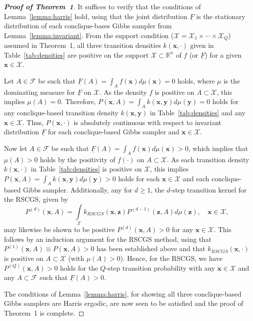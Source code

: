 \documentclass[12pt]{article}
\theoremstyle{definition}
\begin{document}
\begin{proof}[\bf Proof of Theorem~1] It  suffices to verify that the conditions of Lemma~\ref{lemma:harris} hold, using that the joint distribution $\underline{F}$ is the stationary distribution of each conclique-bases Gibbs sampler from   Lemma~\ref{lemma:invariant}. 
  From the support condition ($\mathcal{X} = \mathcal{X}_1 \times \cdots \times \mathcal{X}_Q$) assumed in Theorem~1,   all three transition densities  $k (\boldsymbol x, \cdot)$ given in Table~\ref{tab:densities}  are positive on the support $\mathcal{X} \subset \mathbb{R}^n$ of $f$ (or $\underline{F}$) for a given $\boldsymbol x \in\mathcal{X}$.

Let $A \in \mathcal{F}$   be such that  $\underline{F}(A) = \int_A f(\boldsymbol x) d\mu(\boldsymbol x) = 0$ holds, where $\mu$ is the dominating measure for $\underline{F}$ on $\mathcal{X}$.  As the density $ f$ is positive on $A \subset \mathcal{X}$, this implies $\mu(A) = 0$. Therefore, $P(\boldsymbol x, A) = \int_A k(\boldsymbol x, \boldsymbol y) d\mu(\boldsymbol y) = 0$ holds for any conclique-based transition density $k(\boldsymbol x, \boldsymbol y)$ in Table~\ref{tab:densities} and any
$\boldsymbol x \in\mathcal{X}$.  Thus, $P(\boldsymbol x, \cdot)$ is absolutely continuous with respect to invariant distribution $\underline{F}$ for each  conclique-based Gibbs sampler and $\boldsymbol x \in\mathcal{X}$.

Now  let $A \in\mathcal{F}$  be such that $\underline{F}(A)   = \int_A f(\boldsymbol x) d\mu(\boldsymbol x) > 0$, which implies that $\mu(A) > 0$ holds by the positivity of $ f(\cdot)$ on $A \subset \mathcal{X}$. As each  transition density $k( \boldsymbol x, \cdot)$ in Table~\ref{tab:densities} is positive on $\mathcal{X}$, this implies $P(\boldsymbol x, A) =\int_A k(\boldsymbol x, \boldsymbol y) d\mu(\boldsymbol y)> 0$  holds  for each $\boldsymbol x \in \mathcal{X}$ and each  conclique-based Gibbs sampler. Additionally, any for $d \geq 1$, the $d$-step transition kernel for the RSCGS, given by
\[
P^{(d)}(\boldsymbol x, A) =\int\limits_{\mathcal{X}} k_{RSCGS}(\boldsymbol x, \boldsymbol z) P^{(d-1)}(\boldsymbol z, A)d\mu(\boldsymbol z),\quad  \boldsymbol x \in\mathcal{X},
\]
may likewise be shown to be positive $P^{(d)}(\boldsymbol x, A)>0$ for   any $\boldsymbol x \in \mathcal{X}$.
This follows by an induction argument for the RSCGS method, using that $P^{(1)}(\boldsymbol x, A)\equiv P(\boldsymbol x, A)>0$ has been established above and that $k_{RSCGS}(  \boldsymbol x, \cdot)$ is positive on $A\subset \mathcal{X}$ (with $\mu(A)>0$).  Hence, for the RSCGS, we have $P^{(Q)}(\boldsymbol x, A)>0$ holds for the $Q$-step transition probability  with   any $\boldsymbol x \in \mathcal{X}$
and any $A \subset \mathcal{F}$ such that  $\underline{F}(A)>0$.

The conditions of Lemma~\ref{lemma:harris}, for showing all three conclique-based Gibbs samplers are Harris ergodic, are now seen to be satisfied and the proof of Theorem~1 is complete.
\end{proof}
\end{document}

